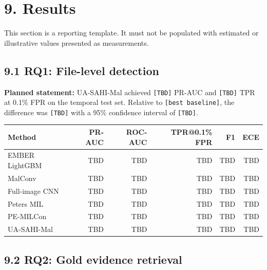 \documentclass[
  10pt,
]{article}
\begin{document}
\section{9. Results}\label{results}

This section is a reporting template. It must not be populated with
estimated or illustrative values presented as measurements.

\subsection{9.1 RQ1: File-level
detection}\label{rq1-file-level-detection}

\textbf{Planned statement:} UA-SAHI-Mal achieved \texttt{{[}TBD{]}}
PR-AUC and \texttt{{[}TBD{]}} TPR at 0.1\% FPR on the temporal test set.
Relative to \texttt{{[}best\ baseline{]}}, the difference was
\texttt{{[}TBD{]}} with a 95\% confidence interval of
\texttt{{[}TBD{]}}.

\begin{longtable}[]{@{}lrrrrr@{}}
\toprule\noalign{}
Method & PR-AUC & ROC-AUC & TPR@0.1\% FPR & F1 & ECE \\
\midrule\noalign{}
\endhead
\bottomrule\noalign{}
\endlastfoot
EMBER LightGBM & TBD & TBD & TBD & TBD & TBD \\
MalConv & TBD & TBD & TBD & TBD & TBD \\
Full-image CNN & TBD & TBD & TBD & TBD & TBD \\
Peters MIL & TBD & TBD & TBD & TBD & TBD \\
PE-MILCon & TBD & TBD & TBD & TBD & TBD \\
UA-SAHI-Mal & TBD & TBD & TBD & TBD & TBD \\
\end{longtable}

\subsection{9.2 RQ2: Gold evidence
retrieval}\label{rq2-gold-evidence-retrieval}
\end{document}

